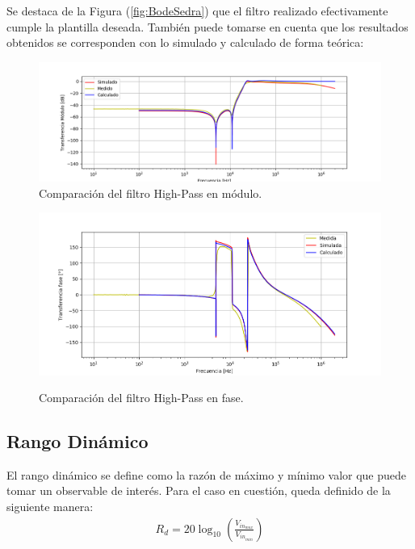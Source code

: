 Se destaca de la Figura (\ref{fig:BodeSedra}) que el filtro realizado efectivamente cumple la plantilla deseada. También puede tomarse en cuenta que los resultados obtenidos se corresponden con lo simulado y calculado de forma teórica:
\begin{figure}[H]
	\centering
	\includegraphics[width=\textwidth]{Imagenes-Ej3/BodeMedCalcSim.png}
	\caption{Comparación del filtro High-Pass en módulo.}
	\label{fig:BodeSedraComp}
\end{figure}
\begin{figure}[H]
	\centering
	\includegraphics[width=\textwidth]{Imagenes-Ej3/BodeMedCalcSimFase.png}
	\label{fig:FaseBodeSedraComp}	
	\caption{Comparación del filtro High-Pass en fase.}
\end{figure}

\subsection{Rango Dinámico}
El rango dinámico se define como la razón de máximo y mínimo valor que puede tomar un observable de interés. Para el caso en cuestión, queda definido de la siguiente manera:
\begin{align}
	R_d = 20 \log_{10} \left( \frac{V_{in_{max}}}{V_{in_{min}}} \right)
\end{align}

